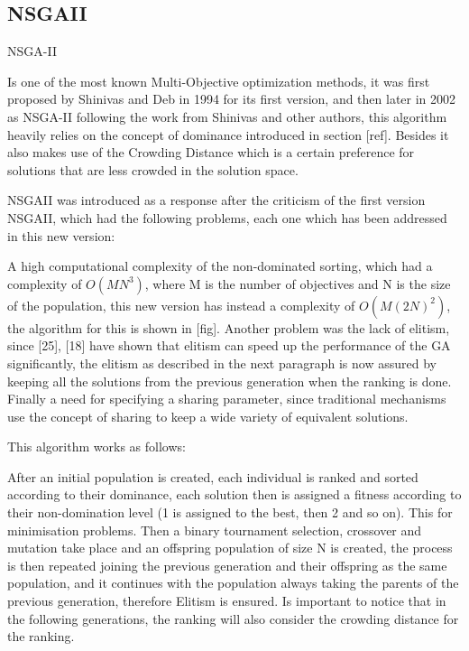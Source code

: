 
\subsection{NSGAII}

NSGA-II

Is one of the most known Multi-Objective optimization methods, it was first proposed by Shinivas and Deb in 1994 for its first version, and then later in 2002 as NSGA-II following the work from Shinivas and other authors, this algorithm heavily relies on the concept of dominance introduced in section [ref]. Besides it also makes use of the Crowding Distance which is a certain preference for solutions that are less crowded in the solution space.

NSGAII was introduced as a response after the criticism of the first version NSGAII, which had the following problems, each one which has been addressed in this new version:

A high computational complexity of the non-dominated sorting, which had a complexity of $O(MN^3)$, where M is the number of objectives and N is the size of the population, this new version has instead a complexity of $O(M(2N)^2)$, the algorithm for this is shown in [fig]. Another problem was the lack of elitism, since [25], [18] have shown that elitism can speed up the performance of the GA significantly, the elitism as described in the next paragraph is now assured by keeping all the solutions from the previous generation when the ranking is done. Finally a need for specifying a sharing parameter, since traditional mechanisms use the concept of sharing to keep a wide variety of equivalent solutions.

This algorithm works as follows:

After an initial population is created, each individual is ranked and sorted according to their dominance, each solution then is assigned a fitness according to their non-domination level (1 is assigned to the best, then 2 and so on). This for minimisation problems. Then a binary tournament selection, crossover and mutation take place and an offspring population of size N is created, the process is then repeated joining the previous generation and their offspring as the same population, and it continues with the population always taking the parents of the previous generation, therefore Elitism is ensured. Is important to notice that in the following generations, the ranking will also consider the crowding distance for the ranking.

